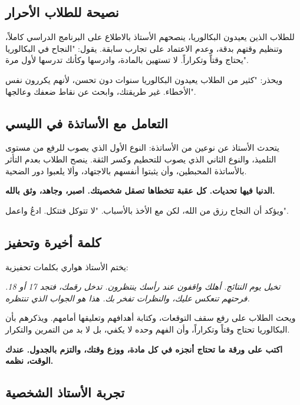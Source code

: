 \documentclass[12pt,a4paper]{book}
\newcommand{\quoteAr}[1]{%
	\begin{myquote}
		\itshape #1
	\end{myquote}
}
\newcommand{\importantAr}[1]{%
	\begin{important}
		\bfseries #1
	\end{important}
}
\begin{document}
\subsection{نصيحة للطلاب الأحرار}
\label{sec:free-candidate-advice2}
للطلاب الذين يعيدون البكالوريا، ينصحهم الأستاذ بالاطلاع على البرنامج الدراسي كاملاً، وتنظيم وقتهم بدقة، وعدم الاعتماد على تجارب سابقة. يقول: "النجاح في البكالوريا يحتاج وقتاً وتكراراً. لا تستهين بالمادة، وادرسها وكأنك تدرسها لأول مرة".

ويحذر: "كثير من الطلاب يعيدون البكالوريا سنوات دون تحسن، لأنهم يكررون نفس الأخطاء. غير طريقتك، وابحث عن نقاط ضعفك وعالجها".

\subsection{التعامل مع الأساتذة في الليسي}

يتحدث الأستاذ عن نوعين من الأساتذة: النوع الأول الذي يصوب للرفع من مستوى التلميذ، والنوع الثاني الذي يصوب للتحطيم وكسر الثقة. ينصح الطلاب بعدم التأثر بالأساتذة المحبطين، وأن يثبتوا أنفسهم بالاجتهاد، وألا يلعبوا دور الضحية.

\importantAr{الدنيا فيها تحديات. كل عقبة تتخطاها تصقل شخصيتك. اصبر، وجاهد، وثق بالله.}

ويؤكد أن النجاح رزق من الله، لكن مع الأخذ بالأسباب. "لا تتوكل فتتكل. ادعُ واعمل".

\subsection{كلمة أخيرة وتحفيز}

يختم الأستاذ هواري بكلمات تحفيزية:

\quoteAr{تخيل يوم النتائج. أهلك واقفون عند رأسك ينتظرون. تدخل رقمك، فتجد 17 أو 18. فرحتهم تنعكس عليك، والنظرات تفخر بك. هذا هو الجواب الذي تنتظره.}

ويحث الطلاب على رفع سقف التوقعات، وكتابة أهدافهم وتعليقها أمامهم. ويذكرهم بأن البكالوريا تحتاج وقتاً وتكراراً، وأن الفهم وحده لا يكفي، بل لا بد من التمرين والتكرار.

\importantAr{اكتب على ورقة ما تحتاج أنجزه في كل مادة، ووزع وقتك، والتزم بالجدول. عندك الوقت، نظمه.}

\subsection{تجربة الأستاذ الشخصية}
\end{document}
